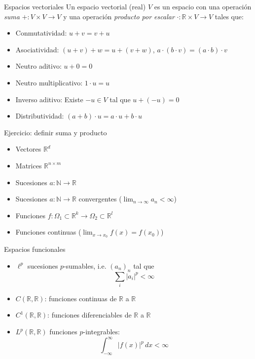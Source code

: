 \documentclass[12pt,aspectratio=169,xcolor=dvipsnames]{beamer}
\newcommand{\R}{\mathbb{R}}
\begin{document}
\begin{frame}[t]{Espacios vectoriales}
    Un espacio vectorial (real) $V$ es un espacio con una operación \emph{suma} $+:V\times V \to V$ y una operación \emph{producto por escalar} $\cdot: \R\times V \to V$ tales que:
    \begin{itemize}
        \item Conmutatividad: $u+v=v+u$
        \item Asociatividad: $(u+v)+w =u+(v+w)$, $a\cdot(b\cdot v)=(a\cdot b)\cdot v$
        \item Neutro aditivo: $u + 0 = 0$
        \item Neutro multiplicativo: $1\cdot u = u$
        \item Inverso aditivo: Existe $-u\in V$ tal que $u + (-u) = 0$
        \item Distributividad: $(a+b)\cdot u = a\cdot u + b\cdot u$
    \end{itemize}
    
    \vspace{0.5cm}
\end{frame}
\begin{frame}{Ejercicio: definir suma y producto}
    \begin{itemize}
        \item Vectores $\R^d$
        \item Matrices $\R^{n\times m}$
        \item Sucesiones $a:\mathbb N\to \R$
        \item Sucesiones $a:\mathbb N \to \R$ convergentes ($\lim_{n\to\infty} a_n < \infty$)
        \item Funciones $f:\Omega_1 \subset \R^k \to \Omega_2\subset \R^l$
        \item Funciones continuas ($\lim_{x\to x_0} f(x) = f(x_0)$)
    \end{itemize}

    \vspace{1cm}
\end{frame}
\begin{frame}{Espacios funcionales}
    \begin{itemize}
        \item $\ell^p$ sucesiones $p$-sumables, i.e. $(a_n)_n$ tal que
                $$ \sum_i |a_i|^p < \infty $$
        \item $C(\R,\R)$: funciones continuas de $\R$ a $\R$
        \item $C^1(\R, \R)$: funciones diferenciables de $\R$ a $\R$
        \item $L^p(\R,\R)$ funciones $p$-integrables:
                $$\int_{-\infty}^\infty |f(x)|^p\,dx < \infty $$
    \end{itemize}
\end{frame}
\end{document}
